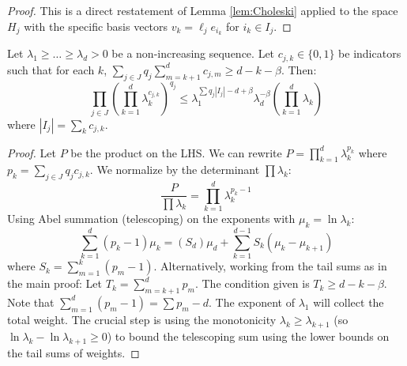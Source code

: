 \begin{proof}
This is a direct restatement of Lemma \ref{lem:Choleski} applied to the space $H_j$ with the specific basis vectors $v_k = \ell_j e_{i_k}$ for $i_k \in I_j$.
\end{proof}

\begin{lemma}
\label{lem:telescoping_eigenvalues}
Let $\lambda_1 \ge \dots \ge \lambda_d > 0$ be a non-increasing sequence. Let $c_{j,k} \in \{0, 1\}$ be indicators such that for each $k$, $\sum_{j \in J} q_j \sum_{m=k+1}^d c_{j,m} \ge d - k - \beta$. Then:
$$\prod_{j \in J} \left( \prod_{k=1}^d \lambda_k^{c_{j,k}} \right)^{q_j} \le \lambda_1^{\sum q_j |I_j| - d + \beta} \lambda_d^{-\beta} \left( \prod_{k=1}^d \lambda_k \right)$$
where $|I_j| = \sum_k c_{j,k}$.
\end{lemma}

\begin{proof}
Let $P$ be the product on the LHS. We can rewrite $P = \prod_{k=1}^d \lambda_k^{p_k}$ where $p_k = \sum_{j \in J} q_j c_{j,k}$.
We normalize by the determinant $\prod \lambda_k$:
$$\frac{P}{\prod \lambda_k} = \prod_{k=1}^d \lambda_k^{p_k - 1}$$
Using Abel summation (telescoping) on the exponents with $\mu_k = \ln \lambda_k$:
$$\sum_{k=1}^d (p_k - 1) \mu_k = (S_d)\mu_d + \sum_{k=1}^{d-1} S_k (\mu_k - \mu_{k+1})$$
where $S_k = \sum_{m=1}^k (p_m - 1)$.
Alternatively, working from the tail sums as in the main proof:
Let $T_k = \sum_{m=k+1}^d p_m$. The condition given is $T_k \ge d - k - \beta$.
Note that $\sum_{m=1}^d (p_m - 1) = \sum p_m - d$.
The exponent of $\lambda_1$ will collect the total weight. The crucial step is using the monotonicity $\lambda_k \ge \lambda_{k+1}$ (so $\ln \lambda_k - \ln \lambda_{k+1} \ge 0$) to bound the telescoping sum using the lower bounds on the tail sums of weights.
\end{proof}